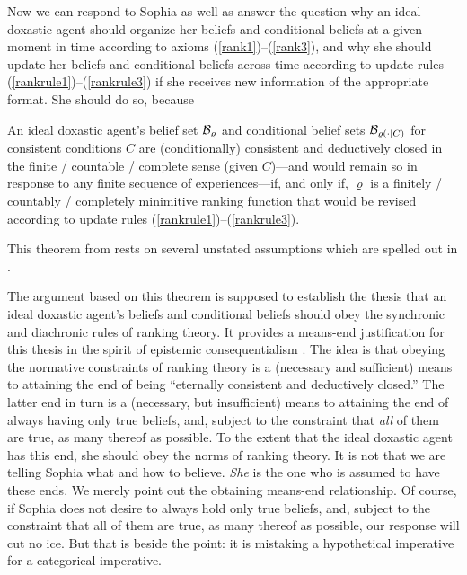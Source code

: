Now we can respond to Sophia as well as answer the question why an ideal doxastic agent should organize her beliefs and conditional beliefs at a given moment in time according to axioms (\ref{rank1})--(\ref{rank3}), and why she should update her beliefs and conditional beliefs across time according to update rules (\ref{rankrule1})--(\ref{rankrule3}) if she receives new information of the appropriate format. She should do so, because
\begin{theorem}
An ideal doxastic agent's belief set $\begin{cal}B\end{cal}_\varrho$ and conditional belief sets $\begin{cal}B\end{cal}_{\varrho\left(\cdot\mid C\right)}$ for consistent conditions $C$ are (conditionally) consistent and deductively closed in the finite / countable / complete sense (given $C$)---and would remain so in response to any finite sequence of experiences---if, and only if, $\varrho$ is a finitely / countably / completely minimitive ranking function that would be revised according to update rules (\ref{rankrule1})--(\ref{rankrule3}).%
\end{theorem}
This theorem from \citet{h07} rests on several unstated assumptions which are spelled out in \citet{h19}.

The argument based on this theorem is supposed to establish the thesis that an ideal doxastic agent's beliefs and conditional beliefs should obey the synchronic and diachronic rules of ranking theory. It provides a means-end justification for this thesis in the spirit of epistemic consequentialism \citep{p02, s02a}. The idea is that obeying the normative constraints of ranking theory is a (necessary and sufficient) means to attaining the end of being ``eternally consistent and deductively closed.'' The latter end in turn is a (necessary, but insufficient) means to attaining the end of always having only true beliefs, and, subject to the constraint that \emph{all} of them are true, as many thereof as possible. To the extent that the ideal doxastic agent has this end, she should obey the norms of ranking theory. It is not that we are telling Sophia what and how to believe. \emph{She} is the one who is assumed to have these ends. We merely point out the obtaining means-end relationship. Of course, if Sophia does not desire to always hold only true beliefs, and, subject to the constraint that all of them are true, as many thereof as possible, our response will cut no ice. But that is beside the point: it is mistaking a hypothetical imperative for a categorical imperative.

